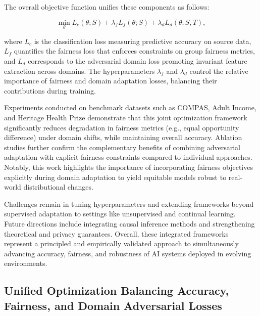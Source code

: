 \documentclass[sigconf]{acmart}
\begin{document}
The overall objective function unifies these components as follows:

\[
\min_{\theta} L_c(\theta; S) + \lambda_f L_f(\theta; S) + \lambda_d L_d(\theta; S, T),
\]

where \(L_c\) is the classification loss measuring predictive accuracy on source data, \(L_f\) quantifies the fairness loss that enforces constraints on group fairness metrics, and \(L_d\) corresponds to the adversarial domain loss promoting invariant feature extraction across domains. The hyperparameters \(\lambda_f\) and \(\lambda_d\) control the relative importance of fairness and domain adaptation losses, balancing their contributions during training.

Experiments conducted on benchmark datasets such as COMPAS, Adult Income, and Heritage Health Prize demonstrate that this joint optimization framework significantly reduces degradation in fairness metrics (e.g., equal opportunity difference) under domain shifts, while maintaining overall accuracy. Ablation studies further confirm the complementary benefits of combining adversarial adaptation with explicit fairness constraints compared to individual approaches. Notably, this work highlights the importance of incorporating fairness objectives explicitly during domain adaptation to yield equitable models robust to real-world distributional changes.

Challenges remain in tuning hyperparameters and extending frameworks beyond supervised adaptation to settings like unsupervised and continual learning. Future directions include integrating causal inference methods and strengthening theoretical and privacy guarantees. Overall, these integrated frameworks represent a principled and empirically validated approach to simultaneously advancing accuracy, fairness, and robustness of AI systems deployed in evolving environments.

\subsection{Unified Optimization Balancing Accuracy, Fairness, and Domain Adversarial Losses}
\end{document}
